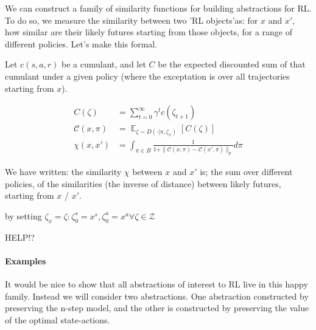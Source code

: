 We can construct a family of similarity functions for building abstractions for RL. To do so, we measure the
similarity between two 'RL objects'\footnotemark[28] as: for $x$ and $x'$,
how similar are their likely futures starting from those objects, for a range of different policies.
Let's make this formal.


Let $c(s, a, r)$ be a cumulant, and let $C$ be the expected discounted sum of that cumulant under a given policy
(where the exceptation is over all trajectories starting from $x$).\footnotemark[29]


\begin{align*}
C(\zeta) &= \sum_{t=0}^{\infty} \gamma^{t}  c(\zeta_{t+1}) \\
\mathcal C(x, \pi) &= \mathop{\mathbb E}_{\zeta \sim D(\cdot | \pi, \zeta_{x})} [C(\zeta)] \\
\chi(x, x') &= \int_{\pi \in B} \frac{1}{1+\parallel \mathcal C(x, \pi) - \mathcal C(x', \pi) \parallel_{p}} d\pi
\end{align*}

We have written: the similarity $\chi$ between $x$ and $x'$ is; the sum over different policies, of the
similarities (the inverse of distance) between likely futures, starting from $x$ / $x'$.

 by setting $\zeta_x = {\zeta: \zeta_0^s = x^s, \zeta_0^a = x^a \forall \zeta \in \mathcal Z}$

{\color{red}HELP!?}


\paragraph{Examples}

It would be nice to show that all abstractions of interest to RL live in this happy family.
Instead we will consider two abstractions. One abstraction constructed by preserving the n-step model,
and the other is constructed by preserving the value of the optimal state-actions.

